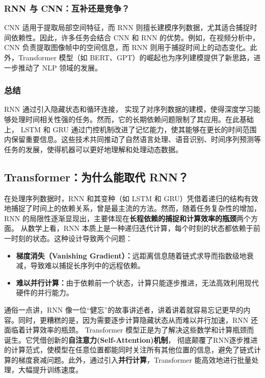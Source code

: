  \subsubsection{ RNN 与 CNN：互补还是竞争？}

CNN 适用于提取局部空间特征，而 RNN 则擅长建模序列数据，尤其适合捕捉时间依赖性。因此，许多任务会结合 CNN 和 RNN 的优势。例如，在视频分析中，CNN 负责提取图像帧中的空间信息，而 RNN 则用于捕捉时间上的动态变化。此外，Transformer 模型（如 BERT、GPT）的崛起也为序列建模提供了新思路，进一步推动了 NLP 领域的发展。
 \subsubsection{总结}
RNN 通过引入隐藏状态和循环连接， 实现了对序列数据的建模，使得深度学习能够处理时间相关性强的任务。然而，它的长期依赖问题限制了其应用。在此基础上， LSTM 和 GRU 通过门控机制改进了记忆能力，使其能够在更长的时间范围内保留重要信息。这些技术共同推动了自然语言处理、语音识别、时间序列预测等任务的发展，使得机器可以更好地理解和处理动态数据。

 \subsection{ Transformer：为什么能取代 RNN？}

在处理序列数据时，RNN 和其变种（如 LSTM 和 GRU）凭借着递归的结构有效地捕捉了时间上的依赖关系，曾是最主流的方法。然而，随着任务复杂性的增加，RNN 的局限性逐渐显现出，主要体现在{\bf 长程依赖的捕捉和计算效率的瓶颈}两个方面。
从数学上看，RNN 本质上是一种递归迭代计算，每个时刻的状态都依赖于前一时刻的状态。这种设计导致两个问题：
\begin{itemize}
\item {\bf  梯度消失（Vanishing Gradient）：}远距离信息随着链式求导而指数级地衰减，导致难以捕捉长序列中的远程依赖。
\item {\bf  难以并行计算：}由于依赖前一个状态，计算只能逐步推进，无法高效利用现代硬件的并行能力。
\end{itemize}
通俗一点讲，RNN 像一位“健忘”的故事讲述者，讲着讲着就容易忘记更早的内容。同时，更糟糕的是，因为需要逐步计算隐藏状态从而难以并行加速，RNN 还面临着计算效率的瓶颈。
Transformer 模型正是为了解决这些数学和计算瓶颈而诞生。它凭借创新的{\bf 自注意力(Self-Attention)机制}，
彻底颠覆了RNN逐步推进的计算范式，使模型在任意位置都能同时关注所有其他位置的信息，避免了链式计算的梯度衰减问题。此外，通过引入{\bf 并行计算}，Transformer 能高效地进行批量处理，大幅提升训练速度。

